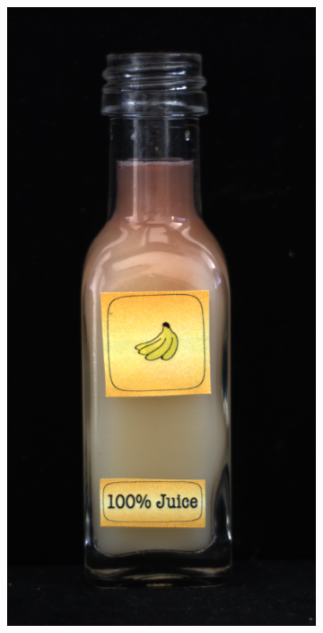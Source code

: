 \begin{figure}[H]
\begin{subfigure}[b]{\textwidth}
\begin{minipage}{0.45\textwidth}
            \includegraphics[width=\textwidth]{figures/appendix/appendix_DRAEM/JB/280.png}

\end{minipage}
\end{subfigure}
\end{figure}
